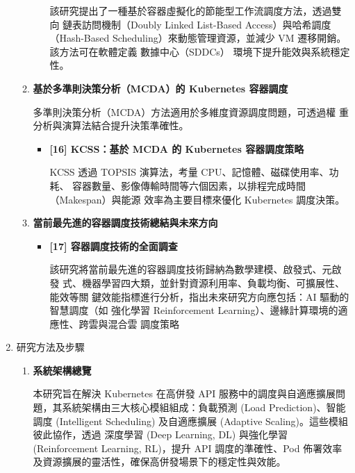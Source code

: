\documentclass[12pt,a4paper]{article}
\begin{document}
\begin{enumerate}[label={(\zhdig*)}, leftmargin=2\parindent, listparindent=\parindent]
\begin{enumerate}[label={(\arabic*)}, leftmargin=\parindent, listparindent=\parindent]
\begin{itemize}[leftmargin=\parindent, listparindent=\parindent]
該研究提出了一種基於容器虛擬化的節能型工作流調度方法，透過雙向
鏈表訪問機制（Doubly Linked List-Based Access）與哈希調度（Hash-Based
Scheduling）來動態管理資源，並減少 VM 遷移開銷。該方法可在軟體定義
數據中心（SDDCs） 環境下提升能效與系統穩定性。

    \end{itemize}
    \item \textbf{
基於多準則決策分析（MCDA）的 Kubernetes 容器調度
}

多準則決策分析（MCDA）方法適用於多維度資源調度問題，可透過權
重分析與演算法結合提升決策準確性。
\begin{itemize}[leftmargin=\parindent, listparindent=\parindent]
    \item \textbf{
[16] KCSS：基於 MCDA 的 Kubernetes 容器調度策略
    }

KCSS 透過 TOPSIS 演算法，考量 CPU、記憶體、磁碟使用率、功耗、
容器數量、影像傳輸時間等六個因素，以排程完成時間（Makespan）與能源
效率為主要目標來優化 Kubernetes 調度決策。

    \end{itemize}
    \item \textbf{
當前最先進的容器調度技術總結與未來方向
}
    \begin{itemize}[leftmargin=\parindent, listparindent=\parindent]
        \item\textbf{
[17] 容器調度技術的全面調查
}

該研究將當前最先進的容器調度技術歸納為數學建模、啟發式、元啟發
式、機器學習四大類，並針對資源利用率、負載均衡、可擴展性、能效等關
鍵效能指標進行分析，指出未來研究方向應包括：AI 驅動的智慧調度（如
強化學習 Reinforcement Learning）、邊緣計算環境的適應性、跨雲與混合雲
調度策略

        \end{itemize}
\end{enumerate}
\item 研究方法及步驟
\begin{enumerate}[label={(\arabic*)}, leftmargin=\parindent, listparindent=\parindent]

\item \textbf{
系統架構總覽
}

本研究旨在解決 Kubernetes 在高併發 API 服務中的調度與自適應擴展問題，其系統架構由三大核心模組組成：負載預測 (Load Prediction)、智能調度 (Intelligent Scheduling) 及自適應擴展 (Adaptive Scaling)。這些模組彼此協作，透過 深度學習 (Deep Learning, DL) 與強化學習 (Reinforcement Learning, RL)，提升 API 調度的準確性、Pod 佈署效率及資源擴展的靈活性，確保高併發場景下的穩定性與效能。


\end{enumerate}
\end{enumerate}
\end{document}
